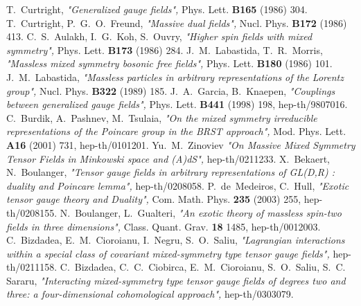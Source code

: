 \documentclass[a4paper,12pt]{article}
\begin{document}
\begin{thebibliography}{99}
T.~Curtright, {\it "Generalized gauge fields",} Phys. Lett. {\bf B165}
(1986) 304.
T.~Curtright, P.~G.~O.~Freund, {\it "Massive dual fields",} Nucl.
Phys. {\bf B172} (1986) 413.
C.~S.~Aulakh, I.~G.~Koh, S.~Ouvry, {\it "Higher spin fields with mixed
symmetry",} Phys. Lett. {\bf B173} (1986) 284.
J.~M.~Labastida, T.~R.~Morris, {\it "Massless mixed symmetry bosonic
free fields",} Phys. Lett. {\bf B180} (1986) 101.
J.~M.~Labastida, {\it "Massless particles in arbitrary representations
of the Lorentz group",} Nucl. Phys. {\bf B322} (1989) 185.
J.~A.~Garcia, B.~Knaepen, {\it "Couplings between generalized gauge
fields",} Phys. Lett. {\bf B441} (1998) 198, hep-th/9807016.
C.~Burdik, A.~Pashnev, M.~Tsulaia, {\it "On the mixed symmetry
irreducible representations of the Poincare group in the BRST
approach",} Mod. Phys. Lett. {\bf A16} (2001) 731, hep-th/0101201.
Yu.~M.~Zinoviev {\it "On Massive Mixed Symmetry Tensor Fields in
Minkowski space and (A)dS",} hep-th/0211233.
X.~Bekaert, N.~Boulanger, {\it "Tensor gauge fields in arbitrary
representations of GL(D,R) : duality and Poincare lemma", }
hep-th/0208058.
P.~de~Medeiros, C.~Hull, {\it "Exotic tensor gauge theory and
Duality", } Com. Math. Phys. {\bf 235} (2003) 255, hep-th/0208155.
N.~Boulanger, L.~Gualteri, {\it "An exotic theory of massless spin-two
fields in three dimensions",} Class. Quant. Grav. {\bf 18} 1485,
hep-th/0012003.
C.~Bizdadea, E.~M.~Cioroianu, I.~Negru, S.~O.~Saliu, {\it "Lagrangian
interactions within a special class of covariant mixed-symmetry type
tensor gauge fields",} hep-th/0211158.
C.~Bizdadea, C.~C.~Ciobirca, E.~M.~Cioroianu, S.~O.~Saliu, S.~C.~
Sararu, {\it "Interacting mixed-symmetry type tensor gauge fields of
degrees two and three: a four-dimensional cohomological approach",}
hep-th/0303079.
\end{thebibliography}
\end{document}

